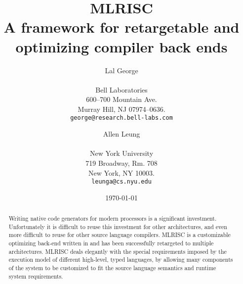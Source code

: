 \documentclass{article}
\begin{document}
   \title{\bf \LARGE MLRISC \\ \large A framework for retargetable and optimizing compiler back ends}  
   \author{\begin{tabular}{c}
            Lal George \\ \\
            Bell Laboratories \\
            600--700 Mountain Ave. \\
            Murray Hill, NJ 07974--0636. \\
            {\tt george@research.bell-labs.com}
            \end{tabular}
          \and 
          \begin{tabular}{c}
            Allen Leung \\ \\
            New York University \\
            719 Broadway, Rm. 708 \\ 
            New York, NY 10003. \\
            {\tt leunga@cs.nyu.edu}
           \end{tabular}
        }

   \date{\today}
   

   \maketitle

   \begin{abstract}
Writing native code generators for modern processors is a significant
investment.  Unfortunately it is difficult
to reuse this investment for other architectures, and even more
difficult to reuse for other source language compilers.   MLRISC is
a customizable optimizing back-end written in
and has been successfully retargeted to multiple architectures.
MLRISC deals elegantly with the special requirements imposed by the
execution model of different high-level, typed languages, by allowing
many components of the system to be customized to fit the source language
semantics and runtime system requirements.
   \end{abstract}
   \tableofcontents
   \newpage




















\end{document}
